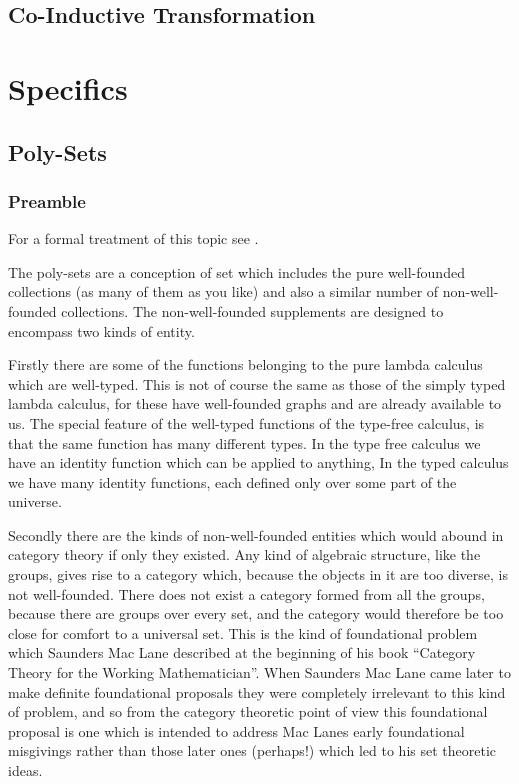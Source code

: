 \documentclass[numreferences]{rbjk}
\begin{document}
\begin{article}
\subsection{Co-Inductive Transformation}

\section{Specifics}

\subsection{Poly-Sets}

\subsubsection{Preamble}

For a formal treatment of this topic see \cite{rbjt020}.

The poly-sets are a conception of set which includes the pure well-founded collections (as many of them as you like) and also a similar number of non-well-founded collections.
The non-well-founded supplements are designed to encompass two kinds of entity.

Firstly there are some of the functions belonging to the pure lambda calculus which are well-typed.
This is not of course the same as those of the simply typed lambda calculus, for these have well-founded graphs and are already available to us.
The special feature of the well-typed functions of the type-free calculus, is that the same function has many different types.
In the type free calculus we have an identity function which can be applied to anything, In the typed calculus we have many identity functions, each defined only over some part of the universe.

Secondly there are the kinds of non-well-founded entities which would abound in category theory if only they existed.
Any kind of algebraic structure, like the groups, gives rise to a category which, because the objects in it are too diverse, is not well-founded.
There does not exist a category formed from all the groups, because there are groups over every set, and the category would therefore be too close for comfort to a universal set.
This is the kind of foundational problem which Saunders Mac Lane described at the beginning of his book ``Category Theory for the Working Mathematician''.
When Saunders Mac Lane came later to make definite foundational proposals they were completely irrelevant to this kind of problem, and so from the category theoretic point of view this foundational proposal is one which is intended to address Mac Lanes early foundational misgivings rather than those later ones (perhaps!) which led to his set theoretic ideas.


\end{article}
\end{document}
